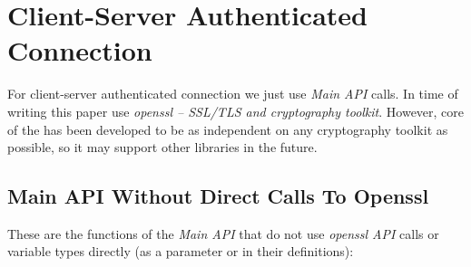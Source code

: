 %
%

\section{Client-Server Authenticated Connection}
\label{s:cs-auth-conn}

For client-server authenticated connection we just use \CANL
\textit{Main API} calls. In time of writing this paper 
\CANL use \textit{openssl -- SSL/TLS and cryptography toolkit}. 
However, core of the \CANL has been developed to be as independent
 on any cryptography toolkit as possible, so it may support 
other libraries in the future.

\subsection{Main API Without Direct Calls To Openssl}
These are the functions of the \textit{Main API} that do not 
use \textit{openssl API} calls or variable types directly
 (as a parameter or in their definitions):

